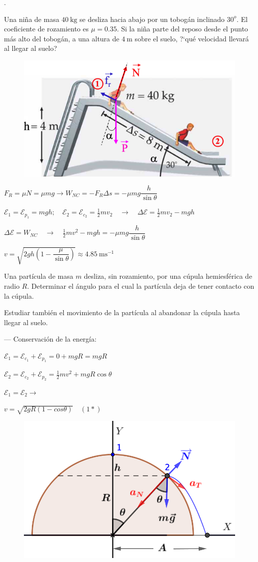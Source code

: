 \begin{prob}.
\begin{multicols}{2}
Una niña de masa $40\ \mathrm{kg}$ se desliza hacia abajo por un tobogán inclinado $30^o$. El coeficiente de rozamiento es $\mu=0.35$. Si la niña parte del reposo desde el punto más alto del tobogán, a una altura de $4 \ \mathrm{m} $ sobre el suelo, ?`qué velocidad llevará al llegar al suelo?
	\begin{figure}[H]
	\centering
	\includegraphics[width=.4\textwidth]{imagenes/imagenes04/T04IM12.png}
\end{figure}
\end{multicols}
\end{prob}

$F_R=\mu N=\mu m g \to W_{NC}=-F_R \Delta s=-\mu m g \dfrac {h}{\sin \theta}$

$\mathcal E_1=\mathcal E_{p_1}=mgh;\quad \mathcal E_2=\mathcal E_{c_2}=\frac 1 2 m v_2 \quad \to \quad \Delta \mathcal E=\frac 1 2 m v_2 - mgh$

$\Delta \mathcal E=W_{NC} \quad \to \quad \frac 1 2 m v^2-mgh=-\mu m g \dfrac {h}{\sin \theta}$

$v=\sqrt{2gh\left(1-\dfrac {\mu}{\sin \theta}  \right)}\approx 4.85\ \mathrm{ms}^{-1}$

\begin{prob}
	Una partícula de masa $m$ desliza, sin rozamiento, por una cúpula hemiesférica de radio $R$. Determinar el ángulo para el cual la partícula deja de tener contacto con la cúpula.
	
	Estudiar también el movimiento de la partícula al abandonar la cúpula hasta llegar al suelo. 
\end{prob}
\begin{multicols}{2}
--- Conservación de la energía:

$\mathcal E_1 =\mathcal E_{c_1}+\mathcal E_{p_1}=0+mgR=mgR$

$\mathcal E_2=\mathcal E_{c_2}+\mathcal E_{p_2}=\frac 1 2 m v^2+mgR\cos \theta$

$\mathcal E_1=\mathcal E_2 \to $

$v=\sqrt{2gR(1-cos \theta)}\quad (1*)$

\begin{figure}[H]
	\centering
	\includegraphics[width=.4\textwidth]{imagenes/imagenes04/T04IM22.png}
\end{figure}
\end{multicols}

